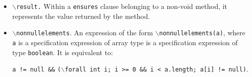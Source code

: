 \documentclass[a4paper]{llncs}
\begin{document}
\begin{itemize}
\item {\tt$\backslash$result.} Within a \texttt{ensures} clause
belonging to a non-void method, it represents the value returned by
the method. %



\item{\texttt{$\backslash$nonnullelements}.} An expression of the form
\texttt{$\backslash$nonnullelements(a)}, where \texttt{a} is a
specification expression of array type is a specification expression
of type \texttt{boolean}. It is equivalent to$:$

\texttt{a != null \&\&}
\texttt{($\backslash$forall int i; i >= 0 \&\& i < a.length; a[i] !=
null)}. 
\end{itemize}




\end{document}
